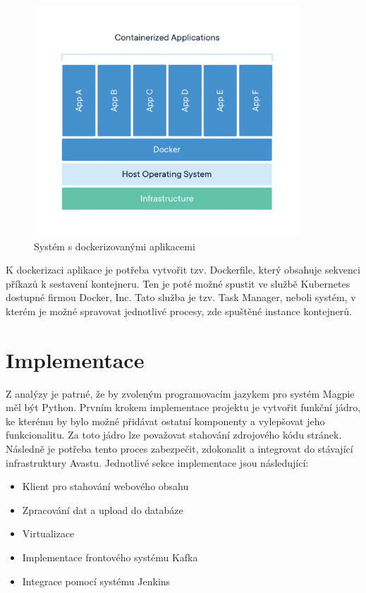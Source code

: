 \documentclass[thesis=M,czech,hidelinks]{FITthesis}[2013/05/06]
\begin{document}
\begin{figure}[H]
	\centering
	\includegraphics[width=10cm]{pictures/docker.png}
	\caption{Systém s dockerizovanými aplikacemi \cite{docker}}
	\label{fig:docker}
\end{figure}



K dockerizaci aplikace je potřeba vytvořit tzv. Dockerfile, který obsahuje sekvenci příkazů k sestavení kontejneru. Ten je poté možné spustit ve službě Kubernetes dostupné firmou Docker, Inc. Tato služba je tzv. Task Manager, neboli systém, v kterém je možné spravovat jednotlivé procesy, zde spuštěné instance kontejnerů.













\chapter{Implementace}
Z analýzy je patrné, že by zvoleným programovacím jazykem pro systém Magpie měl být Python. Prvním krokem implementace projektu je vytvořit funkční jádro, ke kterému by bylo možné přidávat ostatní komponenty a vylepšovat jeho funkcionalitu. Za toto jádro lze považovat stahování zdrojového kódu stránek. Následně je potřeba tento proces zabezpečit, zdokonalit a integrovat do stávající infrastruktury Avastu. Jednotlivé sekce implementace jsou následující:
\begin{itemize}
	\item Klient pro stahování webového obsahu
	\item Zpracování dat a upload do databáze
	\item Virtualizace 
	\item Implementace frontového systému Kafka
	\item Integrace pomocí systému Jenkins
\end{itemize} 
\end{document}
